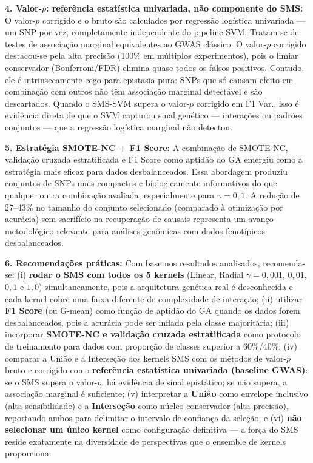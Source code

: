 \documentclass[
    12pt,
    a4paper,
    oneside,
    english,
    french,
    spanish,
    brazil
    ]{abntex2}
\newcommand{\novo}[1]{\textcolor{corNova}{#1}}
\begin{document}
\novo{\textbf{4. Valor-$p$: referência estatística univariada, não componente do SMS:} O valor-$p$ corrigido e o bruto são calculados por regressão logística univariada --- um SNP por vez, completamente independente do pipeline SVM. Tratam-se de testes de associação marginal equivalentes ao GWAS clássico. O valor-$p$ corrigido destacou-se pela alta precisão (100\% em múltiplos experimentos), pois o limiar conservador (Bonferroni/FDR) elimina quase todos os falsos positivos. Contudo, ele é intrinsecamente cego para epistasia pura: SNPs que só causam efeito em combinação com outros não têm associação marginal detectável e são descartados. Quando o SMS-SVM supera o valor-$p$ corrigido em F1 Var., isso é evidência direta de que o SVM capturou sinal genético --- interações ou padrões conjuntos --- que a regressão logística marginal não detectou.}

\novo{\textbf{5. Estratégia SMOTE-NC + F1 Score:} A combinação de SMOTE-NC, validação cruzada estratificada e F1 Score como aptidão do GA emergiu como a estratégia mais eficaz para dados desbalanceados. Essa abordagem produziu conjuntos de SNPs mais compactos e biologicamente informativos do que qualquer outra combinação avaliada, especialmente para $\gamma = 0{,}1$. A redução de 27--43\% no tamanho do conjunto selecionado (comparado à otimização por acurácia) sem sacrifício na recuperação de causais representa um avanço metodológico relevante para análises genômicas com dados fenotípicos desbalanceados.}

\novo{\textbf{6. Recomendações práticas:} Com base nos resultados analisados, recomenda-se: (i) \textbf{rodar o SMS com todos os 5 kernels} (Linear, Radial $\gamma = 0{,}001$, $0{,}01$, $0{,}1$ e $1{,}0$) simultaneamente, pois a arquitetura genética real é desconhecida e cada kernel cobre uma faixa diferente de complexidade de interação; (ii) utilizar \textbf{F1 Score} (ou G-mean) como função de aptidão do GA quando os dados forem desbalanceados, pois a acurácia pode ser inflada pela classe majoritária; (iii) incorporar \textbf{SMOTE-NC e validação cruzada estratificada} como protocolo de treinamento para dados com proporção de classes superior a 60\%/40\%; (iv) comparar a União e a Interseção dos kernels SMS com os métodos de valor-$p$ bruto e corrigido como \textbf{referência estatística univariada (baseline GWAS)}: se o SMS supera o valor-$p$, há evidência de sinal epistático; se não supera, a associação marginal é suficiente; (v) interpretar a \textbf{União} como envelope inclusivo (alta sensibilidade) e a \textbf{Interseção} como núcleo conservador (alta precisão), reportando ambos para delimitar o intervalo de confiança da seleção; e (vi) \textbf{não selecionar um único kernel} como configuração definitiva --- a força do SMS reside exatamente na diversidade de perspectivas que o ensemble de kernels proporciona.}
\end{document}

